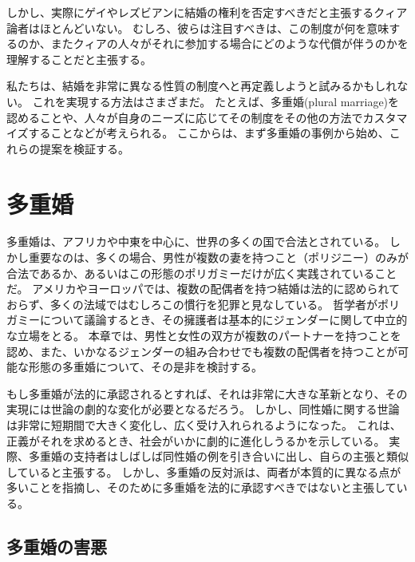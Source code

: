 \documentclass[paper=a4,book,openany]{jlreq}
\begin{document}
しかし、実際にゲイやレズビアンに結婚の権利を否定すべきだと主張するクィア論者はほとんどいない。
むしろ、彼らは注目すべきは、この制度が何を意味するのか、またクィアの人々がそれに参加する場合にどのような代償が伴うのかを理解することだと主張する。

私たちは、結婚を非常に異なる性質の制度へと再定義しようと試みるかもしれない。
これを実現する方法はさまざまだ。
たとえば、多重婚(plural marriage)を認めることや、人々が自身のニーズに応じてその制度をその他の方法でカスタマイズすることなどが考えられる。
ここからは、まず多重婚の事例から始め、これらの提案を検証する。

\section{多重婚}

多重婚は、アフリカや中東を中心に、世界の多くの国で合法とされている。
しかし重要なのは、多くの場合、男性が複数の妻を持つこと（ポリジニー）のみが合法であるか、あるいはこの形態のポリガミーだけが広く実践されていることだ。
アメリカやヨーロッパでは、複数の配偶者を持つ結婚は法的に認められておらず、多くの法域ではむしろこの慣行を犯罪と見なしている。
哲学者がポリガミーについて議論するとき、その擁護者は基本的にジェンダーに関して中立的な立場をとる。
本章では、男性と女性の双方が複数のパートナーを持つことを認め、また、いかなるジェンダーの組み合わせでも複数の配偶者を持つことが可能な形態の多重婚について、その是非を検討する。

もし多重婚が法的に承認されるとすれば、それは非常に大きな革新となり、その実現には世論の劇的な変化が必要となるだろう。
しかし、同性婚に関する世論は非常に短期間で大きく変化し、広く受け入れられるようになった。
これは、正義がそれを求めるとき、社会がいかに劇的に進化しうるかを示している。
実際、多重婚の支持者はしばしば同性婚の例を引き合いに出し、自らの主張と類似していると主張する。
しかし、多重婚の反対派は、両者が本質的に異なる点が多いことを指摘し、そのために多重婚を法的に承認すべきではないと主張している。

\subsection{多重婚の害悪}
\end{document}
